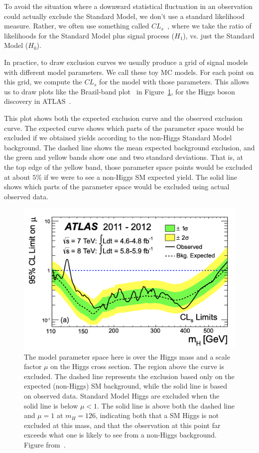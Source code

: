To avoid the situation where a downward statistical fluctuation in an observation could actually exclude the Standard Model, we don't use a standard likelihood measure. Rather, we often use something called $CL_s$~\cite{CLs}, where we take the ratio of likelihoods for the Standard Model plus signal process ($H_1$), vs. just the Standard Model ($H_0$).

In practice, to draw exclusion curves we usually produce a grid of signal models with different model parameters. We call these toy MC models. For each point on this grid, we compute the $CL_s$ for the model with those parameters. This allows us to draw plots like the Brazil-band plot~\cite{Brazil_band} in Figure~\ref{fig:Higgs_CLs}, for the Higgs boson discovery in ATLAS~\cite{HiggsATLAS}.

This plot shows both the expected exclusion curve and the observed exclusion curve. The expected curve shows which parts of the parameter space would be excluded if we obtained yields according to the non-Higgs Standard Model background. The dashed line shows the mean expected background exclusion, and the green and yellow bands show one and two standard deviations. That is, at the top edge of the yellow band, those parameter space points would be excluded at about $5\%$ if we were to see a non-Higgs SM expected yield. The solid line shows which parts of the parameter space would be excluded using actual observed data.

\begin{figure}[htbp]
    \centering
    \includegraphics[width=\linewidth]{Images/ATLAS/Higgs_CLs.png}
    \caption{The model parameter space here is over the Higgs mass and a scale factor $\mu$ on the Higgs cross section. The region above the curve is excluded. The dashed line represents the exclusion based only on the expected (non-Higgs) SM background, while the solid line is based on observed data. Standard Model Higgs are excluded when the solid line is below $\mu<1$. The solid line is above both the dashed line and $\mu=1$ at $m_H=126$, indicating both that a SM Higgs is not excluded at this mass, and that the observation at this point far exceeds what one is likely to see from a non-Higgs background. Figure from~\cite{HiggsATLAS}.}
    \label{fig:Higgs_CLs}
\end{figure}